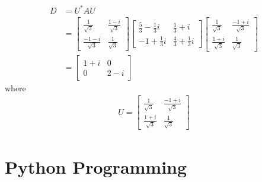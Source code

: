 \begin{solution}
\begin{align*}
D &= U^*AU \\
&= 
\begin{bmatrix}
\frac{1}{\sqrt{3}} & \frac{1-i}{\sqrt{3}} \\ 
\frac{-1-i}{\sqrt{3}}  & \frac{1}{\sqrt{3}}
\end{bmatrix}
\begin{bmatrix}
\frac{5}{3}-\frac{1}{3}i &\frac{1}{3}+i \\ 
-1+\frac{1}{3}i & \frac{4}{3}+\frac{1}{3}i
\end{bmatrix}
\begin{bmatrix}
\frac{1}{\sqrt{3}} & \frac{-1+i}{\sqrt{3}} \\ 
\frac{1+i}{\sqrt{3}} & \frac{1}{\sqrt{3}}
\end{bmatrix} \\
&= 
\begin{bmatrix}
1+i & 0 \\
0 & 2-i
\end{bmatrix}
\end{align*}
where
\begin{align*}
U = \begin{bmatrix}
\frac{1}{\sqrt{3}} & \frac{-1+i}{\sqrt{3}} \\ 
\frac{1+i}{\sqrt{3}} & \frac{1}{\sqrt{3}}
\end{bmatrix} 
\end{align*}
\end{solution}

\section{Python Programming}

